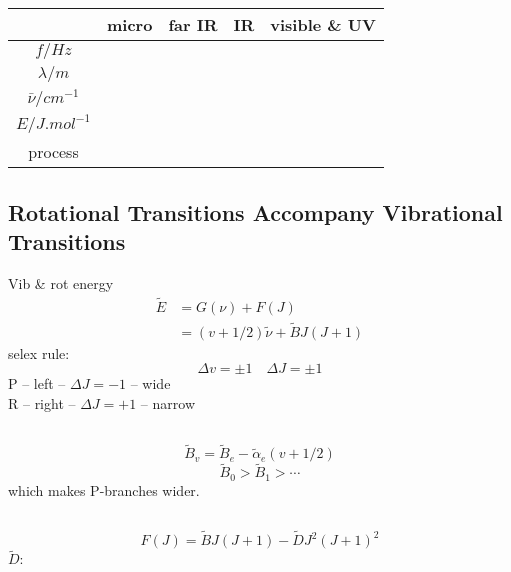 \documentclass[a4paper]{article}
\numberwithin{equation}{section}
\begin{document}
\subsection{}
\begin{table}[H]
	\centering
	\begin{tabular}{ccccc}
		\hline
		& micro & far IR & IR & visible \& UV  \\ \hline
		$ f/\si{Hz} $ &  & & &\\
		$ \lambda/\si{m} $ &  & & &\\
		$ \bar{\nu}/\si{cm^{-1}} $ &&&&\\
		$ E/\si{J.mol^{-1}} $ &  & & &\\
		process &  & & &\\
		\hline
	\end{tabular}
	\caption{}
\end{table}

\subsection{Rotational Transitions Accompany Vibrational Transitions}
Vib \& rot energy
\begin{align}\label{key}
\tilde{E} &= G(\nu) + F(J) \\
&= (v + 1/2)\tilde{\nu} + \tilde{B}J(J+1)
\end{align}
selex rule:
\begin{equation}\label{key}
\Delta v = \pm 1 \quad \Delta J = \pm 1
\end{equation}
P -- left -- $ \Delta J = -1 $ -- wide\\
R -- right -- $ \Delta J = +1 $ -- narrow

\subsection{}
\begin{equation}\label{key}
\tilde{B}_v = \tilde{B}_e - \tilde{\alpha}_e(v + 1/2)
\end{equation}
\begin{equation}\label{key}
\tilde{B}_0 > \tilde{B}_1 > \cdots
\end{equation}
which makes P-branches wider.

\subsection{}
\begin{equation}\label{key}
F(J) = \tilde{B}J(J+1) - \tilde{D}J^2 (J+1)^2
\end{equation}
$ \tilde{D} $: 
\end{document}
